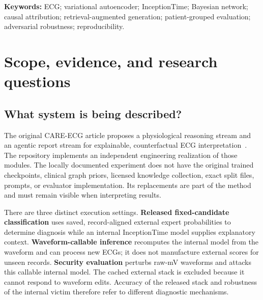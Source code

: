 \documentclass[11pt,a4paper]{article}
\begin{document}
\textbf{Keywords:} ECG; variational autoencoder; InceptionTime; Bayesian network; causal attribution; retrieval-augmented generation; patient-grouped evaluation; adversarial robustness; reproducibility.

\clearpage
\tableofcontents
\clearpage
{}

\section{Scope, evidence, and research questions}
\label{sec:scope}
\subsection{What system is being described?}
The original CARE-ECG article proposes a physiological reasoning stream and an agentic report stream for explainable, counterfactual ECG interpretation~\cite{care}. The repository implements an independent engineering realization of those modules. The locally documented experiment does not have the original trained checkpoints, clinical graph priors, licensed knowledge collection, exact split files, prompts, or evaluator implementation. Its replacements are part of the method and must remain visible when interpreting results.

There are three distinct execution settings. \textbf{Released fixed-candidate classification} uses saved, record-aligned external expert probabilities to determine diagnosis while an internal InceptionTime model supplies explanatory context. \textbf{Waveform-callable inference} recomputes the internal model from the waveform and can process new ECGs; it does not manufacture external scores for unseen records. \textbf{Security evaluation} perturbs raw-mV waveforms and attacks this callable internal model. The cached external stack is excluded because it cannot respond to waveform edits. Accuracy of the released stack and robustness of the internal victim therefore refer to different diagnostic mechanisms.
\end{document}
